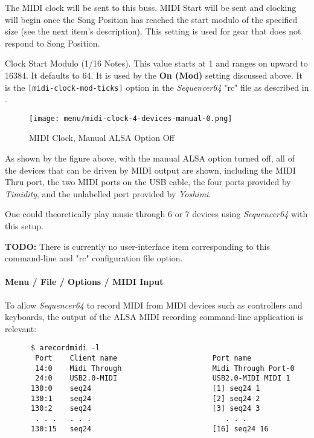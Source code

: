    The MIDI clock will be sent to this buss.
   MIDI Start will be sent and clocking will begin
   once the Song Position has reached the start modulo of the specified size
   (see the next item's description).
   This setting is used for gear that does not respond to Song Position.

   Clock Start Modulo (1/16 Notes).
   This value starts at 1 and ranges on upward to 16384.
   It  defaults to 64.
   It is used by the \textbf{On (Mod)} setting discussed above.
   It is the \texttt{[midi-clock-mod-ticks]} option in the \textsl{Sequencer64}
   "rc" file as described in
   .

\begin{figure}[H]
   \centering 
   \texttt{[image: menu/midi-clock-4-devices-manual-0.png]}
   \caption{MIDI Clock, Manual ALSA Option Off}
   \label{fig:seq64_midi_clock_4_devices_manual_0}
\end{figure}

   As shown by the figure above, with the manual ALSA option turned off,
   all of the devices that can be driven by MIDI output are shown,
   including the MIDI Thru port, the two MIDI ports on the USB cable,
   the four ports provided by \textsl{Timidity}, and the unlabelled
   port provided by \textsl{Yoshimi}.

   One could theoretically play music through 6 or 7 devices using
   \textsl{Sequencer64} with this setup.

   \textbf{TODO:} 
   There is currently no user-interface item corresponding to this command-line
   and "rc" configuration file option.

\paragraph{Menu / File / Options / MIDI Input}
\label{paragraph:seq64_menu_file_options_midi_input}

   To allow \textsl{Sequencer64} to record MIDI from MIDI devices such as
   controllers and keyboards, the output of the ALSA MIDI recording
   command-line application is relevant:

   \begin{verbatim}
      $ arecordmidi -l
       Port    Client name                      Port name
       14:0    Midi Through                     Midi Through Port-0
       24:0    USB2.0-MIDI                      USB2.0-MIDI MIDI 1
      130:0    seq24                            [1] seq24 1
      130:1    seq24                            [2] seq24 2
      130:2    seq24                            [3] seq24 3
       . . .   . . .                               . . .
      130:15   seq24                            [16] seq24 16
   \end{verbatim}

